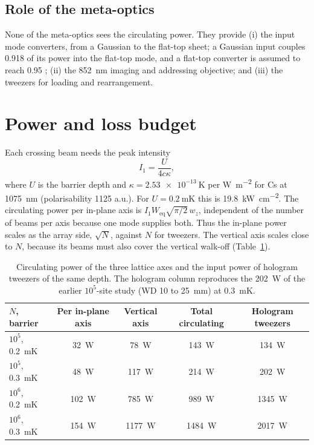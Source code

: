 \documentclass[11pt]{article}
\begin{document}
\subsection{Role of the meta-optics}

None of the meta-optics sees the circulating power. They provide (i) the input mode converters, from
a Gaussian to the flat-top sheet; a Gaussian input couples 0.918 of its power into the flat-top mode,
and a flat-top converter is assumed to reach 0.95 \placeholder{[VALUE?]}; (ii) the \SI{852}{\nano\metre}
imaging and addressing objective; and (iii) the tweezers for loading and rearrangement.

\section{Power and loss budget}
\label{sec:budget}

Each crossing beam needs the peak intensity
\begin{equation}
  I_1 = \frac{U}{4 c \kappa},
  \label{eq:I1}
\end{equation}
where $U$ is the barrier depth and $\kappa = \SI{2.53e-13}{\kelvin}$ per \si{\watt\per\metre\squared}
for Cs at \SI{1075}{\nano\metre} (polarisability 1125 a.u.). For $U = \SI{0.2}{\milli\kelvin}$ this is
\SI{19.8}{\kilo\watt\per\centi\metre\squared}. The circulating power per in-plane axis is
$I_1 W_\mathrm{eq} \sqrt{\pi/2}\, w_z$, independent of the number of beams per axis because one mode
supplies both. Thus the in-plane power scales as the array side, $\sqrt{N}$, against $N$ for tweezers.
The vertical axis scales close to $N$, because its beams must also cover the vertical walk-off
(Table~\ref{tab:power}).

\begin{table}[htbp]
\centering
\caption{Circulating power of the three lattice axes and the input power of hologram tweezers of the
same depth. The hologram column reproduces the \SI{202}{\watt} of the earlier $10^{5}$-site study (WD 10 to \SI{25}{\milli\metre}) at
\SI{0.3}{\milli\kelvin}.}
\label{tab:power}
\small
\begin{tabular}{@{}lcccc@{}}
\toprule
$N$, barrier & Per in-plane axis & Vertical axis & Total circulating & Hologram tweezers \\
\midrule
$10^{5}$, \SI{0.2}{\milli\kelvin} & \SI{32}{\watt} & \SI{78}{\watt} & \SI{143}{\watt} & \SI{134}{\watt} \\
$10^{5}$, \SI{0.3}{\milli\kelvin} & \SI{48}{\watt} & \SI{117}{\watt} & \SI{214}{\watt} & \SI{202}{\watt} \\
$10^{6}$, \SI{0.2}{\milli\kelvin} & \SI{102}{\watt} & \SI{785}{\watt} & \SI{989}{\watt} & \SI{1345}{\watt} \\
$10^{6}$, \SI{0.3}{\milli\kelvin} & \SI{154}{\watt} & \SI{1177}{\watt} & \SI{1484}{\watt} & \SI{2017}{\watt} \\
\bottomrule
\end{tabular}
\end{table}
\end{document}
